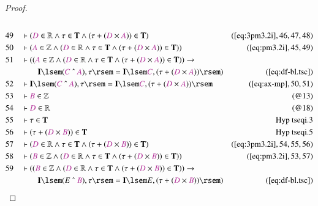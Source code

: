 \begin{proof}
\begin{align}
  \\ 49 &&  & \vdash ( \mc{D} \in \mathbb{R} \wedge \tau \in \mathbf{T} \wedge
      ( \tau + ( \mc{D} \times \mc{A} ) ) \in \mathbf{T}
      )&(\mbox{\ref{eq:3pm3.2i}},46,47,48)\notag
  \\ 50 &&  & \vdash ( \mc{A} \in \mathbb{Z} \wedge ( \mc{D} \in \mathbb{R}
      \wedge \tau \in \mathbf{T} \wedge ( \tau + ( \mc{D}
      \times \mc{A} ) ) \in \mathbf{T} )
      )&(\mbox{\ref{eq:pm3.2i}},45,49)\notag
  \\ 51 &&  & \vdash ( ( \mc{A} \in \mathbb{Z} \wedge ( \mc{D} \in \mathbb{R}
      \wedge \tau \in \mathbf{T} \wedge ( \tau + ( \mc{D}
      \times \mc{A} ) ) \in \mathbf{T} ) ) \rightarrow \notag \\ & & & \qquad
      \mathbf{I} \lsem ( \mc{C} ~\string^~ \mc{A} ) , \tau
      \rsem = \mathbf{I} \lsem \mc{C} , ( \tau + ( \mc{D}
      \times \mc{A} ) ) \rsem
      )&(\mbox{\ref{eq:df-bl.tsc}})\notag
  \\ 52 &&  & \vdash \mathbf{I} \lsem ( \mc{C} ~\string^~ \mc{A} ) , \tau \rsem
      = \mathbf{I} \lsem \mc{C} , ( \tau + ( \mc{D} \times
      \mc{A} ) ) \rsem&(\mbox{\ref{eq:ax-mp}},50,51)\notag
  \\ 53 &&  & \vdash \mc{B} \in \mathbb{Z}&(@13)\notag
  \\ 54 &&  & \vdash \mc{D} \in \mathbb{R}&(@18)\notag
  \\ 55 &&  & \vdash \tau \in \mathbf{T}&\text{Hyp~tseqi.3}\notag%
  \\ 56 &&  & \vdash ( \tau + ( \mc{D} \times \mc{B} ) ) \in
      \mathbf{T}&\text{Hyp~tseqi.5}\notag%
  \\ 57 &&  & \vdash ( \mc{D} \in \mathbb{R} \wedge \tau \in \mathbf{T} \wedge
      ( \tau + ( \mc{D} \times \mc{B} ) ) \in \mathbf{T}
      )&(\mbox{\ref{eq:3pm3.2i}},54,55,56)\notag
  \\ 58 &&  & \vdash ( \mc{B} \in \mathbb{Z} \wedge ( \mc{D} \in \mathbb{R}
      \wedge \tau \in \mathbf{T} \wedge ( \tau + ( \mc{D}
      \times \mc{B} ) ) \in \mathbf{T} )
      )&(\mbox{\ref{eq:pm3.2i}},53,57)\notag
  \\ 59 &&  & \vdash ( ( \mc{B} \in \mathbb{Z} \wedge ( \mc{D} \in \mathbb{R}
      \wedge \tau \in \mathbf{T} \wedge ( \tau + ( \mc{D}
      \times \mc{B} ) ) \in \mathbf{T} ) ) \rightarrow \notag \\ & & & \qquad
      \mathbf{I} \lsem ( E ~\string^~ \mc{B} ) , \tau \rsem
      = \mathbf{I} \lsem E , ( \tau + ( \mc{D} \times \mc{B}
      ) ) \rsem )&(\mbox{\ref{eq:df-bl.tsc}})\notag

\end{align}
\end{proof}
